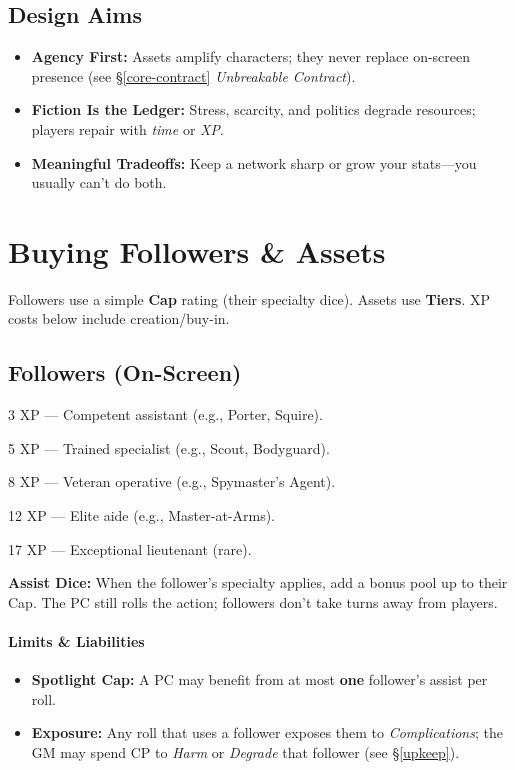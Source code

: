 \documentclass[12pt]{book}
\begin{document}
\subsection*{Design Aims}
\begin{itemize}
  \item \textbf{Agency First:} Assets amplify characters; they never replace on-screen presence (see \S\ref{core-contract} \emph{Unbreakable Contract}).
  \item \textbf{Fiction Is the Ledger:} Stress, scarcity, and politics degrade resources; players repair with \emph{time} or \emph{XP}.
  \item \textbf{Meaningful Tradeoffs:} Keep a network sharp or grow your stats—you usually can’t do both.
\end{itemize}

\section{Buying Followers \& Assets}
Followers use a simple \textbf{Cap} rating (their specialty dice). Assets use \textbf{Tiers}. XP costs below include creation/buy-in.

\subsection{Followers (On-Screen)}
\begin{description}[leftmargin=3.2cm]
  \item[Cap 1] 3 XP — Competent assistant (e.g., Porter, Squire).
  \item[Cap 2] 5 XP — Trained specialist (e.g., Scout, Bodyguard).
  \item[Cap 3] 8 XP — Veteran operative (e.g., Spymaster’s Agent).
  \item[Cap 4] 12 XP — Elite aide (e.g., Master-at-Arms).
  \item[Cap 5] 17 XP — Exceptional lieutenant (rare).
\end{description}
\textbf{Assist Dice:} When the follower’s specialty applies, add a bonus pool up to their Cap. The PC still rolls the action; followers don’t take turns away from players.

\paragraph{Limits \& Liabilities}
\begin{itemize}
  \item \textbf{Spotlight Cap:} A PC may benefit from at most \textbf{one} follower’s assist per roll.
  \item \textbf{Exposure:} Any roll that uses a follower exposes them to \emph{Complications}; the GM may spend CP to \emph{Harm} or \emph{Degrade} that follower (see \S\ref{upkeep}).
\end{itemize}
\end{document}
